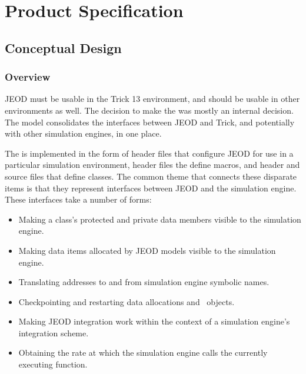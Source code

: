 %
% 

\chapter{Product Specification}\label{ch:spec}

\section{Conceptual Design}
\label{sec:conceptual_design}

\subsection{Overview}

JEOD must be usable in the Trick 13 environment,
and should be usable in other environments as well.
The decision to make the \ModelDesc was mostly an internal decision.
The model consolidates the interfaces between JEOD and Trick,
and potentially with other simulation engines, in one place.

The \ModelDesc is implemented in the form of
header files that configure JEOD for use in a particular simulation environment,
header files the define macros,
and header and source files that define classes.
The common theme that connects these disparate items is
that they represent interfaces between JEOD and the simulation engine.
These interfaces take a number of forms:
\begin{itemize}
\item Making a class's protected and private data members
  visible to the simulation engine.
\item Making data items allocated by JEOD models
  visible to the simulation engine.
\item Translating addresses to and from simulation engine symbolic names.
\item Checkpointing and restarting data allocations and \CONTAINER\ objects.
\item Making JEOD integration work within the context
  of a simulation engine's integration scheme.
\item Obtaining the rate at which the simulation engine calls
  the currently executing function. 
\end{itemize}

